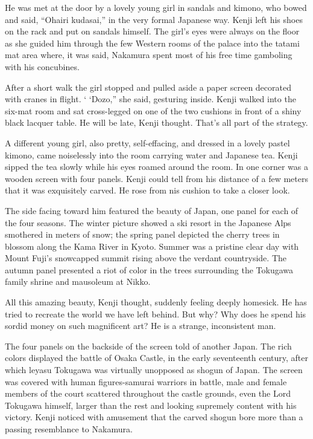 \documentclass[]{article}
\begin{document}
{He was met at the door by a lovely young girl in sandals and kimono, who bowed and said, “Ohairi kudasai,” in the very formal Japanese way.  Kenji left his shoes on the rack and put on sandals himself.  The girl’s eyes were always on the floor as she guided him through the few Western rooms of the palace into the tatami mat area where, it was said, Nakamura spent most of his free time gamboling with his concubines.

After a short walk the girl stopped and pulled aside a paper screen decorated with cranes in flight.  ‘ ‘Dozo,” she said, gesturing inside.  Kenji walked into the six-mat room and sat cross-legged on one of the two cushions in front of a shiny black lacquer table.  He will be late, Kenji thought.  That’s all part of the strategy.

A different young girl, also pretty, self-effacing, and dressed in a lovely pastel kimono, came noiselessly into the room carrying water and Japanese tea.  Kenji sipped the tea slowly while his eyes roamed around the room.  In one corner was a wooden screen with four panels.  Kenji could tell from his distance of a few meters that it was exquisitely carved.  He rose from nis cushion to take a closer look.

The side facing toward him featured the beauty of Japan, one panel for each of the four seasons.  The winter picture showed a ski resort in the Japanese Alps smothered in meters of snow; the spring panel depicted the cherry trees in blossom along the Kama River in Kyoto.  Summer was a pristine clear day with Mount Fuji’s snowcapped summit rising above the verdant countryside.  The autumn panel presented a riot of color in the trees surrounding the Tokugawa family shrine and mausoleum at Nikko.

All this amazing beauty, Kenji thought, suddenly feeling deeply homesick.  He has tried to recreate the world we have left behind.  But why? Why does he spend his sordid money on such magnificent art? He is a strange, inconsistent man.

The four panels on the backside of the screen told of another Japan.  The rich colors displayed the battle of Osaka Castle, in the early seventeenth century, after which leyasu Tokugawa was virtually unopposed as shogun of Japan.  The screen was covered with human figures-samurai warriors in battle, male and female members of the court scattered throughout the castle grounds, even the Lord Tokugawa himself, larger than the rest and looking supremely content with his victory.  Kenji noticed with amusement that the carved shogun bore more than a passing resemblance to Nakamura.

}
\end{document}
